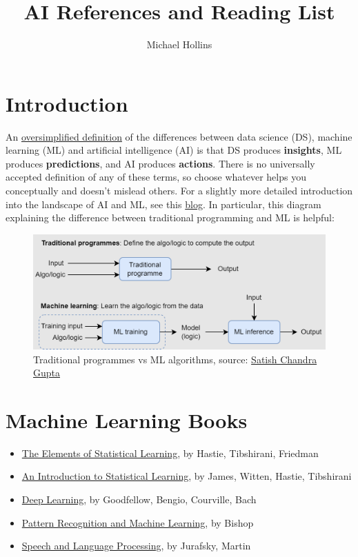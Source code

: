 \documentclass{article}
\title{AI References and Reading List}
\author{Michael Hollins}
\begin{document}
\maketitle

\section{Introduction}

An \href{http://varianceexplained.org/r/ds-ml-ai/}{oversimplified definition} of the differences between data science (DS), machine learning (ML) and artificial intelligence (AI) is that DS produces \textbf{insights}, ML produces \textbf{predictions}, and AI produces \textbf{actions}. There is no universally accepted definition of any of these terms, so choose whatever helps you conceptually and doesn't mislead others. For a slightly more detailed introduction into the landscape of AI and ML, see this \href{https://www.ml4devs.com/articles/machine-learning-intro-for-developers/}{blog}. In particular, this diagram explaining the difference between traditional programming and ML is helpful:

\begin{figure}[H]
    \centering
    \includegraphics[width=\textwidth]{MLExplainer.png}
    \caption{Traditional programmes vs ML algorithms, source: \href{https://www.ml4devs.com/articles/machine-learning-intro-for-developers/}{Satish Chandra Gupta}}
    \label{fig:MLExplainer}
\end{figure}

\section{Machine Learning Books}

\begin{itemize}
    \item \href{https://link.springer.com/book/10.1007/978-0-387-84858-7}{The Elements of Statistical Learning}, by Hastie, Tibshirani, Friedman
    \item \href{https://www.statlearning.com/}{An Introduction to Statistical Learning}, by James, Witten, Hastie, Tibshirani
    \item \href{https://www.deeplearningbook.org/}{Deep Learning}, by Goodfellow, Bengio, Courville, Bach
    \item \href{https://www.microsoft.com/en-us/research/people/cmbishop/prml-book/}{Pattern Recognition and Machine Learning}, by Bishop
    \item \href{https://web.stanford.edu/~jurafsky/slp3/}{Speech and Language Processing}, by Jurafsky, Martin
\end{itemize}
\end{document}
